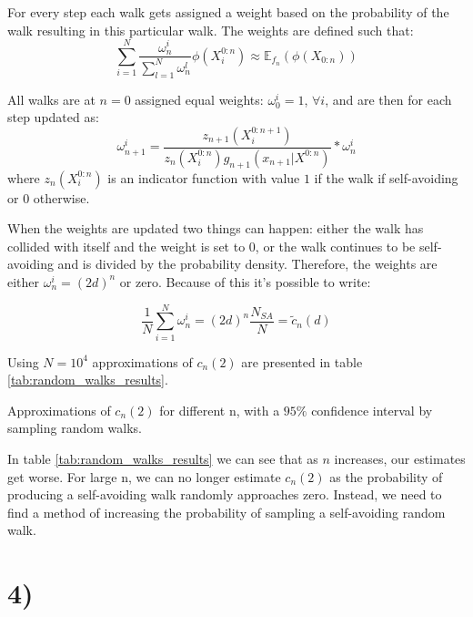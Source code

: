 \documentclass[a4paper]{article}
\begin{document}
For every step each walk gets assigned a weight based on the probability of the walk resulting in this particular walk. The weights are defined such that:
\begin{equation}
    \sum_{i = 1}^N\frac{\omega_n^i}{\sum_{l=1}^N\omega_n^l}\phi(X_i^{0:n}) \approx \mathbb{E}_{f_n}(\phi(X_{0:n})) 
\end{equation}

All walks are at $n = 0$ assigned equal weights: $\omega_0^i = 1$, $\forall i$, and are then for each step updated as:
\begin{equation}
    \label{eq:weights}
    \omega_{n+1}^i = \frac{z_{n+1}(X_i^{0:n+1})}{z_{n}(X_i^{0:n})g_{n+1}(x_{n+1}|X^{0:n})} * \omega_n^i
\end{equation}
where $z_n(X_i^{0:n})$ is an indicator function with value $1$ if the walk if self-avoiding or $0$ otherwise.

When the weights are updated two things can happen: either the walk has collided with itself and the weight is set to $0$, or the walk continues to be self-avoiding and is divided by the probability density. Therefore, the weights are either $\omega_n^i = (2d)^n$ or zero. Because of this it's possible to write:

\begin{equation}
   \frac{1}{N}\sum_{i=1}^N\omega_n^i = (2d)^n \frac{N_{SA}}{N} = \tilde{c}_n(d)
\end{equation}

Using $N = 10^4$ approximations of $c_n(2)$ are presented in table \ref{tab:random_walks_results}.

\begin{table}[H]
    \centering
    \caption{Approximations of $c_n(2)$ for different n, with a $95\%$ confidence interval by sampling random walks.}
    \label{tab:random_walks_results}
    
\end{table}

In table \ref{tab:random_walks_results} we can see that as $n$ increases, our estimates get worse. For large n, we can no longer estimate $c_n(2)$ as the probability of producing a self-avoiding walk randomly approaches zero. Instead, we need to find a method of increasing the probability of sampling a self-avoiding random walk.

\section*{4)}
\end{document}
